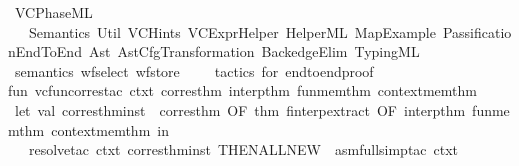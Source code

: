 %
\begin{isabellebody}%
%
%
\isadelimtheory
%
\endisadelimtheory
%
\isatagtheory
{}\isamarkupfalse%
\ VCPhaseML\ \ \ \ \ \ \ \ \ \ \ \ \ \ \ \ \ \ \ \ \ \ \ \ \ \ \ \ \ \ \ \ \ \ \ \ \ \ \isanewline
\ \ \ Semantics\ Util\ VCHints\ VCExprHelper\ HelperML\ MapExample\ PassificationEndToEnd\ Ast\ Ast{\isacharunderscore}{\kern0pt}Cfg{\isacharunderscore}{\kern0pt}Transformation\ BackedgeElim\ TypingML\isanewline
{}%
\endisatagtheory
{\isafoldtheory}%
%
\isadelimtheory
\isanewline
%
\endisadelimtheory
\isanewline
{}\isamarkupfalse%
\ semantics\ wf{\isacharunderscore}{\kern0pt}select\ wf{\isacharunderscore}{\kern0pt}store%
\isadelimproof
\ %
\endisadelimproof
%
\isatagproof
\isakeywordONE{{\isachardot}{\kern0pt}}\isamarkupfalse%
%
\endisatagproof
{\isafoldproof}%
%
\isadelimproof
%
\endisadelimproof
\isanewline
%
\isadelimML
\isanewline
%
\endisadelimML
%
\isatagML
{}\isamarkupfalse%
\ {\isacartoucheopen}\isanewline
{\isacharparenleft}{\kern0pt}{\isacharasterisk}{\kern0pt}{\isacharasterisk}{\kern0pt}\ tactics\ for\ end{\isacharminus}{\kern0pt}to{\isacharminus}{\kern0pt}endproof{\isacharasterisk}{\kern0pt}{\isacharasterisk}{\kern0pt}{\isacharparenright}{\kern0pt}\isanewline
\isanewline
fun\ vc{\isacharunderscore}{\kern0pt}fun{\isacharunderscore}{\kern0pt}corres{\isacharunderscore}{\kern0pt}tac\ ctxt\ corres{\isacharunderscore}{\kern0pt}thm\ interp{\isacharunderscore}{\kern0pt}thm\ fun{\isacharunderscore}{\kern0pt}mem{\isacharunderscore}{\kern0pt}thm\ context{\isacharunderscore}{\kern0pt}mem{\isacharunderscore}{\kern0pt}thm\ {\isacharequal}{\kern0pt}\isanewline
\ let\ val\ corres{\isacharunderscore}{\kern0pt}thm{\isacharunderscore}{\kern0pt}inst\ {\isacharequal}{\kern0pt}\ corres{\isacharunderscore}{\kern0pt}thm\ OF\ {\isacharbrackleft}{\kern0pt}{\isacharparenleft}{\kern0pt}{\isacharat}{\kern0pt}{\isacharbraceleft}{\kern0pt}thm\ finterp{\isacharunderscore}{\kern0pt}extract{\isacharunderscore}{\kern0pt}{}{\isacharbraceright}{\kern0pt}\ OF\ {\isacharbrackleft}{\kern0pt}interp{\isacharunderscore}{\kern0pt}thm{\isacharcomma}{\kern0pt}\ fun{\isacharunderscore}{\kern0pt}mem{\isacharunderscore}{\kern0pt}thm{\isacharcomma}{\kern0pt}\ context{\isacharunderscore}{\kern0pt}mem{\isacharunderscore}{\kern0pt}thm{\isacharbrackright}{\kern0pt}{\isacharparenright}{\kern0pt}{\isacharbrackright}{\kern0pt}\ in\isanewline
\ \ \ resolve{\isacharunderscore}{\kern0pt}tac\ ctxt\ {\isacharbrackleft}{\kern0pt}corres{\isacharunderscore}{\kern0pt}thm{\isacharunderscore}{\kern0pt}inst{\isacharbrackright}{\kern0pt}\ THEN{\isacharunderscore}{\kern0pt}ALL{\isacharunderscore}{\kern0pt}NEW\ \ {\isacharparenleft}{\kern0pt}asm{\isacharunderscore}{\kern0pt}full{\isacharunderscore}{\kern0pt}simp{\isacharunderscore}{\kern0pt}tac\ ctxt{\isacharparenright}{\kern0pt}\isanewline

\end{isabellebody}
